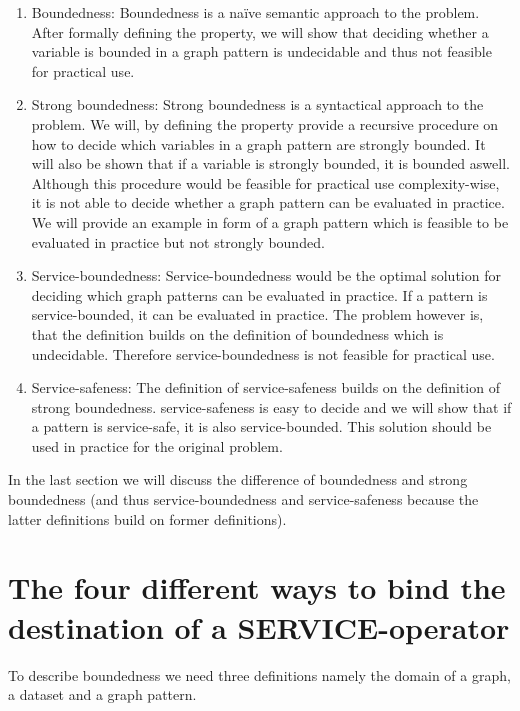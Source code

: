 \begin{enumerate}
	\item Boundedness: Boundedness is a na{\"i}ve semantic approach to the
		problem. After formally defining the property, we will show that
		deciding whether a variable is bounded in a graph pattern
		is undecidable and thus not feasible for practical use.

	\item Strong boundedness: Strong boundedness is a syntactical approach to
		the problem. We will, by defining the property provide a recursive
		procedure on how to decide which variables in a graph pattern are
		strongly bounded. It will also be shown that if a variable is strongly
		bounded, it is bounded aswell. 
		Although this procedure would be feasible for practical
		use complexity-wise, it is not able to decide whether a graph pattern
		can be evaluated in practice. We will provide an example in form of a
		graph pattern which is feasible to be evaluated in practice but not
		strongly bounded.

	\item Service-boundedness: Service-boundedness would be the optimal solution for
		deciding which graph patterns can be evaluated in practice. If a pattern
		is service-bounded, it can be evaluated in practice. The problem however
		is, that the definition builds on the definition of boundedness which is
		undecidable. Therefore service-boundedness is not feasible for practical
		use.
	\item Service-safeness: The definition of service-safeness builds on the
		definition of strong boundedness. 
		service-safeness is easy to decide and we will show that if a pattern is
		service-safe, it is also service-bounded. This solution should be used in
		practice for the original problem.
\end{enumerate}

In the last section we will discuss the difference of boundedness and strong
boundedness (and thus service-boundedness and service-safeness because the
latter definitions build on former definitions). 

\section{The four different ways to bind the destination of a SERVICE-operator}

To describe boundedness we need three definitions namely the domain of a graph,
a dataset and a graph pattern.

